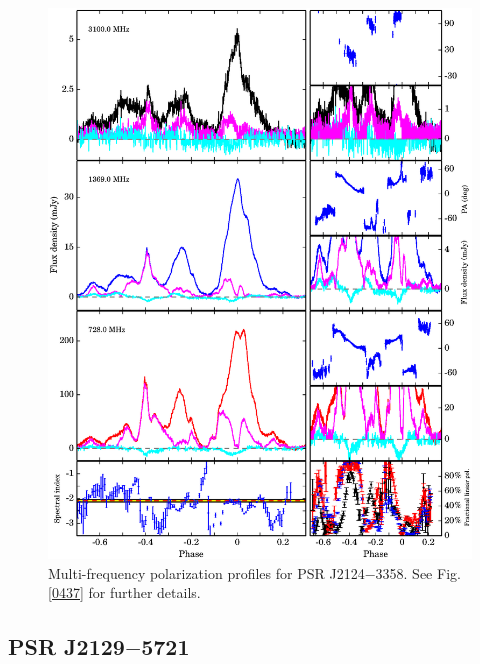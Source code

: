 \documentclass[useAMS,usenatbib]{mn2e}
\begin{document}
\begin{figure}
\begin{center}
\includegraphics[width=6 in]{2124.ps}
\caption{Multi-frequency polarization profiles for PSR J2124$-$3358. 
See Fig. \ref{0437} for further details.}
\label{2124}
\end{center}
\end{figure}


\subsection{PSR J2129$-$5721}
\end{document}
